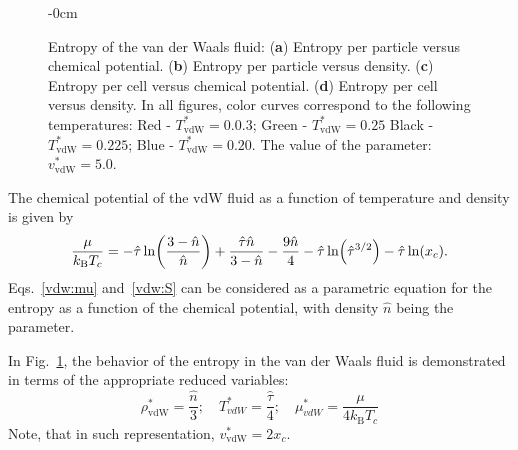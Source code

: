 \documentclass[entropy,article,submit,pdftex,moreauthors]{Definitions/mdpi}
\begin{document}
\begin{figure}[H]
\begin{adjustwidth}{-\extralength}{0cm}
		\end{adjustwidth}
	\caption{Entropy of the van der Waals fluid: (\textbf{a}) Entropy per particle versus chemical potential. (\textbf{b}) Entropy per particle versus density. (\textbf{c}) Entropy per cell versus chemical potential. (\textbf{d}) Entropy per cell versus density. In all figures, color curves correspond to the following temperatures: Red - $T^*_{\mathrm{vdW}}=0.0.3$; Green - $T^*_{\mathrm{vdW}}=0.25$ Black - $T^*_{\mathrm{vdW}}=0.225$; Blue - $T^*_{\mathrm{vdW}} = 0.20$. The value of the parameter: $v^*_{\mathrm{vdW}}=5.0$.\label{fig:entropy_vdW}}
\end{figure} 

The chemical potential of the vdW fluid as a function of temperature and density is given by~\cite[(70c)]{Johnston14}
\begin{equation}
	\label{vdw:mu}
	\frac{\mu}{k_{\rm B}T_c} = -\hat{\tau} \ln \left(\frac{3-\hat{n}}{\hat{n}}\right) + \frac{\hat{\tau}\hat{n}}{3-\hat{n}} - \frac{9\hat{n}}{4} - \hat{\tau}\ln(\hat{\tau}^{3/2}) - \hat{\tau}\ln(x_c).
\end{equation}
Eqs.~\eqref{vdw:mu} and~\eqref{vdw:S} can be considered as a parametric equation for the entropy as a function of the chemical potential, with density $\hat{n}$ being the parameter.

In Fig.~\ref{fig:entropy_vdW}, the behavior of the entropy in the van der Waals fluid is demonstrated in terms of the appropriate reduced variables:
\begin{equation}
	\rho^*_{\mathrm{vdW}} = \frac{\hat{n}}{3}; \quad T^*_{vdW} = \frac{\hat{\tau}}{4}; \quad \mu^*_{vdW} = \frac{\mu}{4k_{\mathrm B}T_c}
\end{equation}
Note, that in such representation, $v^*_{\mathrm{vdW}} = 2x_c$.
\end{document}
